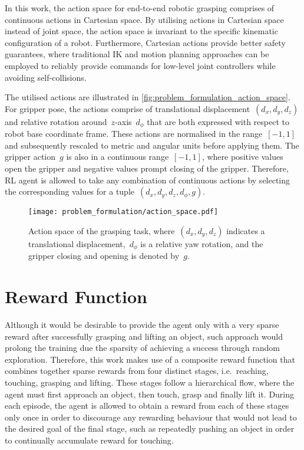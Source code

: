 In this work, the action space for end-to-end robotic grasping comprises of continuous actions in Cartesian space. By utilising actions in Cartesian space instead of joint space, the action space is invariant to the specific kinematic configuration of a robot. Furthermore, Cartesian actions provide better safety guarantees, where traditional IK and motion planning approaches can be employed to reliably provide commands for low-level joint controllers while avoiding self-collisions.

The utilised actions are illustrated in \autoref{fig:problem_formulation_action_space}. For gripper pose, the actions comprise of translational displacement~\((d_{x},d_{y},d_{z})\) and relative rotation around~\(z\)-axis~\(d_{\phi}\) that are both expressed with respect to robot base coordinate frame. These actions are normalised in the range~\([-1, 1]\) and subsequently rescaled to metric and angular units before applying them. The gripper action~\(g\) is also in a continuous range~\([-1, 1]\), where positive values open the gripper and negative values prompt closing of the gripper. Therefore, RL agent is allowed to take any combination of continuous actions by selecting the corresponding values for a tuple~\((d_{x},d_{y},d_{z},d_{\phi},g)\).

\begin{figure}[ht]
    \centering
    \texttt{[image: problem\_formulation/action\_space.pdf]}
    \caption{Action space of the grasping task, where~\((d_{x},d_{y},d_{z})\) indicates a translational displacement,~\(d_{\phi}\) is a relative yaw rotation, and the gripper closing and opening is denoted by~\(g\).}
    \label{fig:problem_formulation_action_space}
\end{figure}


\section{Reward Function}

Although it would be desirable to provide the agent only with a very sparse reward after successfully grasping and lifting an object, such approach would prolong the training due the sparsity of achieving a success through random exploration. Therefore, this work makes use of a composite reward function that combines together sparse rewards from four distinct stages, i.e.~reaching, touching, grasping and lifting. These stages follow a hierarchical flow, where the agent must first approach an object, then touch, grasp and finally lift it. During each episode, the agent is allowed to obtain a reward from each of these stages only once in order to discourage any rewarding behaviour that would not lead to the desired goal of the final stage, such as repeatedly pushing an object in order to continually accumulate reward for touching.


